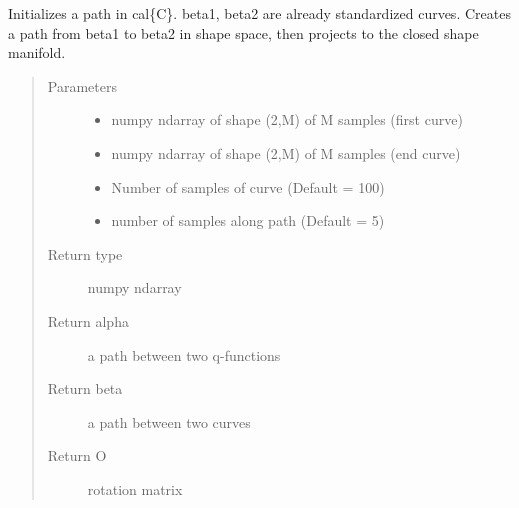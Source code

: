 \documentclass[letterpaper,10pt,english]{sphinxmanual}
\begin{document}
\begin{fulllineitems}
\label{\detokenize{geodesic:geodesic.init_path_geod}}
Initializes a path in cal\{C\}. beta1, beta2 are already
standardized curves. Creates a path from beta1 to beta2 in
shape space, then projects to the closed shape manifold.
\begin{quote}\begin{description}
\item[{Parameters}] \leavevmode\begin{itemize}
\item {} 
 \textendash{} numpy ndarray of shape (2,M) of M samples (first curve)

\item {} 
 \textendash{} numpy ndarray of shape (2,M) of M samples (end curve)

\item {} 
 \textendash{} Number of samples of curve (Default = 100)

\item {} 
 \textendash{} number of samples along path (Default = 5)

\end{itemize}

\item[{Return type}] \leavevmode
numpy ndarray

\item[{Return alpha}] \leavevmode
a path between two q-functions

\item[{Return beta}] \leavevmode
a path between two curves

\item[{Return O}] \leavevmode
rotation matrix

\end{description}\end{quote}

\end{fulllineitems}

\end{document}
